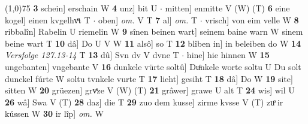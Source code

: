 \documentclass[8pt,a4paper,notitlepage]{article}
\begin{document}
\begin{table}[ht]
\begin{minipage}[t]{0.5\linewidth}
\line(1,0){75} \newline
\textbf{3} schein] erschain W \textbf{4} unz] bit U  $\cdot$ mitten] enmitte V (W) (T) \textbf{6} eine kogel] einen kvgelhvͦt T  $\cdot$ oben] \textit{om.} V T \textbf{7} al] \textit{om.} T  $\cdot$ vrisch] von eim velle W \textbf{8} ribbalîn] Rabelin U riemelin W \textbf{9} sînen beinen wart] seinem baine warn W sinem beine wart T \textbf{10} dâ] Do U V W \textbf{11} alsô] so T \textbf{12} blîben in] in beleiben do W \textbf{14} \textit{Versfolge 127.13-14} T  \textbf{13} dû] Svn dv V dvne T  $\cdot$ hine] hie hinnen W \textbf{15} ungebanten] vngebante V \textbf{16} dunkele vürte soltû] Duͦnkele worte soltu U Du solt dunckel fúrte W soltu tvnkele vurte T \textbf{17} lieht] gesiht T \textbf{18} dâ] Do W \textbf{19} site] sitten W \textbf{20} grüezen] grvͤze V (W) (T) \textbf{21} grâwer] grawe U alt T \textbf{24} wis] wil U \textbf{26} wâ] Swa V (T) \textbf{28} daz] die T \textbf{29} zuo dem kusse] zirme kvsse V (T) zuͦ ir kússen W \textbf{30} ir lîp] \textit{om.} W \newline
\end{minipage}
\end{table}
\end{document}
